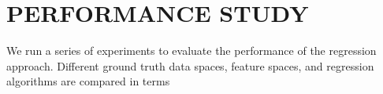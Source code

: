 \documentclass[journal, twoside]{IEEEtran}
\begin{document}
\section{PERFORMANCE STUDY}
We run a series of experiments to evaluate the performance of the regression approach. Different ground truth data spaces, feature spaces, and regression algorithms are compared in terms

%
%



%
%
\end{document}
